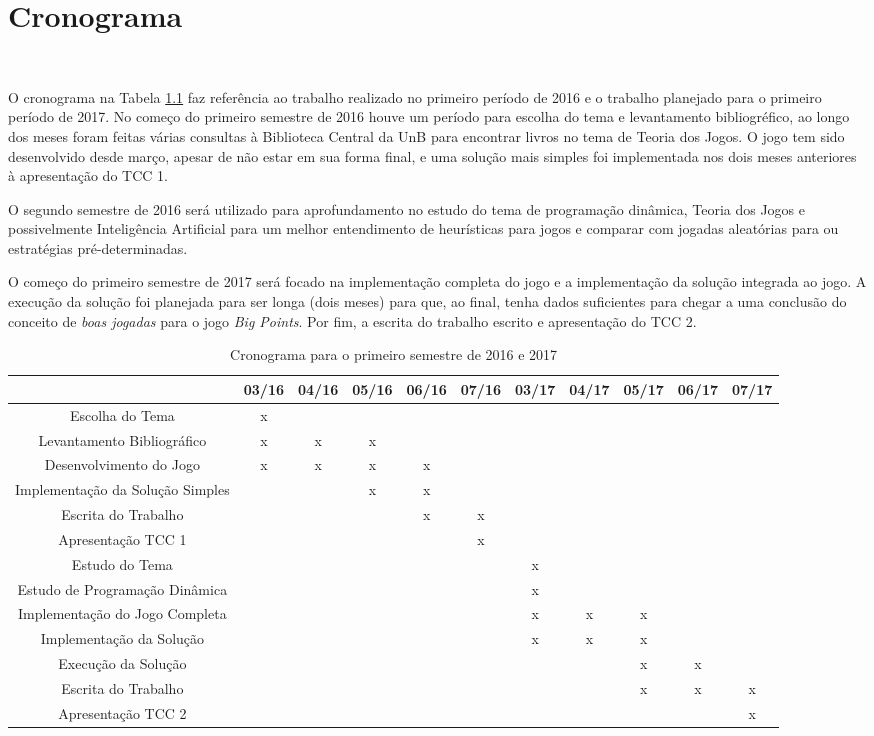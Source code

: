 \chapter[Cronograma]{Cronograma}\
\label{cha:cronograma}

O cronograma na Tabela \ref{tab:cronograma} faz referência ao trabalho realizado no primeiro período de 2016 e o trabalho planejado para o primeiro período de 2017. No começo do primeiro semestre de 2016 houve um período para escolha do tema e levantamento bibliogréfico, ao longo dos meses foram feitas várias consultas à Biblioteca Central da UnB para encontrar livros no tema de Teoria dos Jogos. O jogo tem sido desenvolvido desde março, apesar de não estar em sua forma final, e uma solução mais simples foi implementada nos dois meses anteriores à apresentação do TCC 1.

O segundo semestre de 2016 será utilizado para aprofundamento no estudo do tema de programação dinâmica, Teoria dos Jogos e possivelmente Inteligência Artificial para um melhor entendimento de heurísticas para jogos e comparar com jogadas aleatórias para ou estratégias pré-determinadas.

O começo do primeiro semestre de 2017 será focado na implementação completa do jogo e a implementação da solução integrada ao jogo. A execução da solução foi planejada para ser longa (dois meses) para que, ao final, tenha dados suficientes para chegar a uma conclusão do conceito de \emph{boas jogadas} para o jogo \emph{Big Points}. Por fim, a escrita do trabalho escrito e apresentação do TCC 2.

\begin{table}[ht]
	\centering
\begin{turn}{90}
\begin{tabular}{|c|c|c|c|c|c|c|c|c|c|c|}
\cline{2-11}
\multicolumn{1}{c|}{} & \textbf{03/16} & \textbf{04/16} & \textbf{05/16} & \textbf{06/16} & \textbf{07/16} & \textbf{03/17} & \textbf{04/17} & \textbf{05/17} & \textbf{06/17} & \textbf{07/17}\tabularnewline
\hline
Escolha do Tema & x &  &  &  &  &  &  &  &  & \tabularnewline
\hline
Levantamento Bibliográfico & x & x & x &  &  &  &  &  &  & \tabularnewline
\hline
Desenvolvimento do Jogo & x & x & x & x &  &  &  &  &  & \tabularnewline
\hline
Implementação da Solução Simples &  &  & x & x &  &  &  &  &  & \tabularnewline
\hline
Escrita do Trabalho &  &  &  & x & x &  &  &  &  & \tabularnewline
\hline
Apresentação TCC 1 &  &  &  &  & x &  &  &  &  & \tabularnewline
\hline
Estudo do Tema &  &  &  &  &  & x &  &  &  & \tabularnewline
\hline
Estudo de Programação Dinâmica &  &  &  &  &  & x &  &  &  & \tabularnewline
\hline
Implementação do Jogo Completa &  &  &  &  &  & x & x & x &  & \tabularnewline
\hline
Implementação da Solução  &  &  &  &  &  & x & x & x &  & \tabularnewline
\hline
Execução da Solução  &  &  &  &  &  &  &  & x & x & \tabularnewline
\hline
Escrita do Trabalho &  &  &  &  &  &  &  & x & x & x\tabularnewline
\hline
Apresentação TCC 2 &  &  &  &  &  &  &  &  &  & x\tabularnewline
\hline
\end{tabular}
\end{turn}
\caption{Cronograma para o primeiro semestre de 2016 e 2017}
\label{tab:cronograma}
\end{table}
